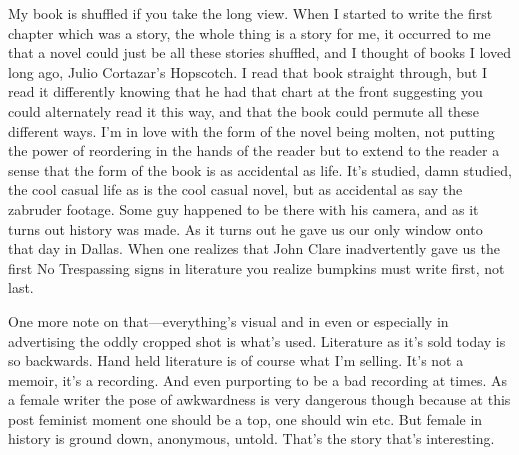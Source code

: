 \documentclass[
]{memoir}
\begin{document}
My book is shuffled if you take the long view. When I started to write
the first chapter which was a story, the whole thing is a story for me,
it occurred to me that a novel could just be all these stories shuffled,
and I thought of books I loved long ago, Julio Cortazar's Hopscotch. I
read that book straight through, but I read it differently knowing that
he had that chart at the front suggesting you could alternately read it
this way, and that the book could permute all these different ways. I'm
in love with the form of the novel being molten, not putting the power
of reordering in the hands of the reader but to extend to the reader a
sense that the form of the book is as accidental as life. It's studied,
damn studied, the cool casual life as is the cool casual novel, but as
accidental as say the zabruder footage. Some guy happened to be there
with his camera, and as it turns out history was made. As it turns out
he gave us our only window onto that day in Dallas. When one realizes
that John Clare inadvertently gave us the first No Trespassing signs in
literature you realize bumpkins must write first, not last.

One more note on that---everything's visual and in even or especially in
advertising the oddly cropped shot is what's used. Literature as it's
sold today is so backwards. Hand held literature is of course what I'm
selling. It's not a memoir, it's a recording. And even purporting to be
a bad recording at times. As a female writer the pose of awkwardness is
very dangerous though because at this post feminist moment one should be
a top, one should win etc. But female in history is ground down,
anonymous, untold. That's the story that's interesting.
\end{document}
